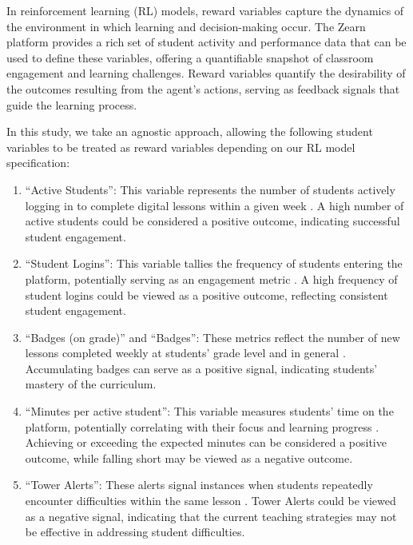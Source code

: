 \documentclass[
  number,
  preprint,
  3p,
  onecolumn]{elsarticle}
\begin{document}
In reinforcement learning (RL) models, reward variables capture the
dynamics of the environment in which learning and decision-making occur.
The Zearn platform provides a rich set of student activity and
performance data that can be used to define these variables, offering a
quantifiable snapshot of classroom engagement and learning challenges.
Reward variables quantify the desirability of the outcomes resulting
from the agent's actions, serving as feedback signals that guide the
learning process.

In this study, we take an agnostic approach, allowing the following
student variables to be treated as reward variables depending on our RL
model specification:

\begin{enumerate}
\def\labelenumi{\arabic{enumi}.}
\item
  ``Active Students'': This variable represents the number of students
  actively logging in to complete digital lessons within a given week
  \citep{zearn2022}. A high number of active students could be
  considered a positive outcome, indicating successful student
  engagement.
\item
  ``Student Logins'': This variable tallies the frequency of students
  entering the platform, potentially serving as an engagement metric
  \citep{zearn2024}. A high frequency of student logins could be viewed
  as a positive outcome, reflecting consistent student engagement.
\item
  ``Badges (on grade)'' and ``Badges'': These metrics reflect the number
  of new lessons completed weekly at students' grade level and in
  general \citep{zearn2024a}. Accumulating badges can serve as a
  positive signal, indicating students' mastery of the curriculum.
\item
  ``Minutes per active student'': This variable measures students' time
  on the platform, potentially correlating with their focus and learning
  progress \citep{zearn2022}. Achieving or exceeding the expected
  minutes can be considered a positive outcome, while falling short may
  be viewed as a negative outcome.
\item
  ``Tower Alerts'': These alerts signal instances when students
  repeatedly encounter difficulties within the same lesson
  \citep{zearn2024b}. Tower Alerts could be viewed as a negative signal,
  indicating that the current teaching strategies may not be effective
  in addressing student difficulties.
\end{enumerate}
\end{document}
